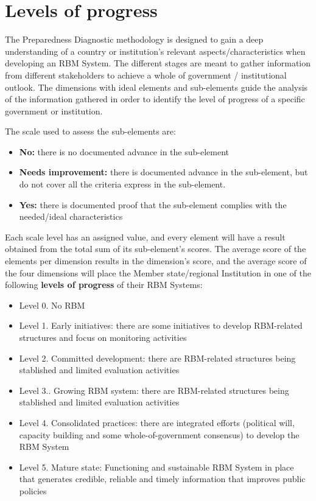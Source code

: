 \documentclass[
  10pt,
]{book}
\providecommand{\tightlist}{%
  \setlength{\itemsep}{0pt}\setlength{\parskip}{0pt}}
\begin{document}
\hypertarget{levels-of-progress}{%
\section{Levels of progress}\label{levels-of-progress}}

The Preparedness Diagnostic methodology is designed to gain a deep understanding of a country or institution's relevant aspects/characteristics when developing an RBM System. The different stages are meant to gather information from different stakeholders to achieve a whole of government / institutional outlook. The dimensions with ideal elements and sub-elements guide the analysis of the information gathered in order to identify the level of progress of a specific government or institution.

The scale used to assess the sub-elements are:

\begin{itemize}
\tightlist
\item
  \textbf{No:} there is no documented advance in the sub-element
\item
  \textbf{Needs improvement:} there is documented advance in the sub-element, but do not cover all the criteria express in the sub-element.
\item
  \textbf{Yes:} there is documented proof that the sub-element complies with the needed/ideal characteristics
\end{itemize}

Each scale level has an assigned value, and every element will have a result obtained from the total sum of its sub-element's scores. The average score of the elements per dimension results in the dimension's score, and the average score of the four dimensions will place the Member state/regional Institution in one of the following \textbf{levels of progress} of their RBM Systems:

\begin{itemize}
\tightlist
\item
  Level 0. No RBM
\item
  Level 1. Early initiatives: there are some initiatives to develop RBM-related structures and focus on monitoring activities
\item
  Level 2. Committed development: there are RBM-related structures being stablished and limited evaluation activities
\item
  Level 3.. Growing RBM system: there are RBM-related structures being stablished and limited evaluation activities
\item
  Level 4. Consolidated practices: there are integrated efforts (political will, capacity building and some whole-of-government consensus) to develop the RBM System
\item
  Level 5. Mature state: Functioning and sustainable RBM System in place that generates credible, reliable and timely information that improves public policies
\end{itemize}
\end{document}
